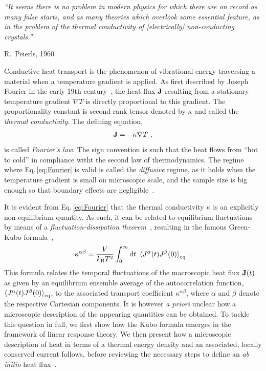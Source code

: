 \epigraph{\singlespacing \it ``It seems there is no problem in modern physics for which there are on record as many false starts, and as many theories which overlook some essential feature, as in the problem of the thermal conductivity of [electrically] non-conducting crystals.''}{R.~Peierls, 1960~\cite{Peierls1960}}


Conductive heat transport is the phenomenon of vibrational energy traversing a material when a temperature gradient is applied. As first described by Joseph Fourier in the early 19th century~\cite{Fourier1878}, the heat flux ${\bf J}$ resulting from a stationary temperature gradient $\nabla T$ is directly proportional to this gradient. The proportionality constant is second-rank tensor denoted by $\kappa$ and called the \emph{thermal conductivity}. The defining equation,
\begin{align}
  \b J = - \kappa \nabla T~,
  \label{eq:Fourier}
\end{align}
is called \emph{Fourier's law}. The sign convention is such that the heat flows from ``hot to cold'' in compliance witht the second law of thermodynamics. The regime where Eq.\,\eqref{eq:Fourier} is valid is called the \emph{diffusive} regime, as it holds when the temperature gradient is small on microscopic scale, and the sample size is big enough so that boundary effects are negligible~\cite{Kapitza1941a,Antidormi2020}.

It is evident from Eq.\,\eqref{eq:Fourier} that the thermal conductivity $\kappa$ is an explicitly non-equilibrium quantity. As such, it can be related to equilibrium fluctuations by means of a \emph{fluctuation-dissipation theorem}~\cite{Einstein1905a,Nyquist1928,Callen1951,Kubo1957a}, resulting in the famous Green-Kubo formula~\cite{Green1952,Kubo1957b},
\begin{align}
  \kappa^{\alpha \beta} = \frac{V}{k_{\rm B} T^2} \int_{0}^{\infty} \d t ~
    \braket{J^\alpha (t) J^\beta(0)}_{\rm eq}~.
  \label{eq:GreenKubo}
\end{align}
This formula relates the temporal fluctuations of the macroscopic heat flux ${\bf J} (t)$ as given by an equilibrium ensemble average of the autocorrelation function, $\braket{J^\alpha (t) J^\beta(0)}_{\rm eq}$, to the associated transport coefficient $\kappa^{\alpha \beta}$, where $\alpha$ and $\beta$ denote the respective Cartesian components. It is however \emph{a priori} unclear how a microscopic description of the appearing quantities can be obtained. To tackle this question in full, we first show how the Kubo formula emerges in the framework of linear response theory. We then present how a microscopic description of heat in terms of a thermal energy density and an associated, locally conserved current follows, before reviewing the necessary steps to define an \emph{ab initio} heat flux~\cite{Carbogno2016}.

